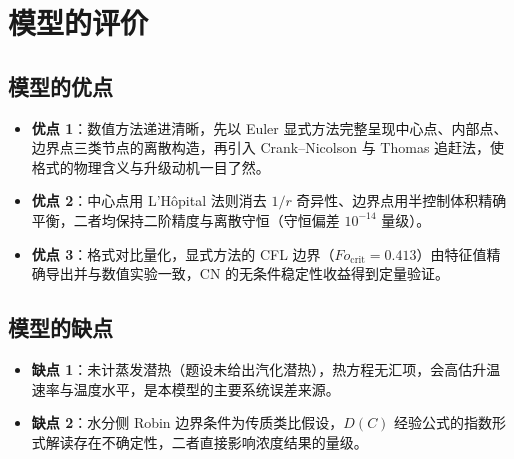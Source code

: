 \section{模型的评价}

\subsection{模型的优点}
\begin{itemize}
  \item \textbf{优点 1}：数值方法递进清晰，先以 Euler 显式方法完整呈现中心点、内部点、边界点三类节点的离散构造，再引入 Crank--Nicolson 与 Thomas 追赶法，使格式的物理含义与升级动机一目了然。
  \item \textbf{优点 2}：中心点用 L'H\^opital 法则消去 $1/r$ 奇异性、边界点用半控制体积精确平衡，二者均保持二阶精度与离散守恒（守恒偏差 $10^{-14}$ 量级）。
  \item \textbf{优点 3}：格式对比量化，显式方法的 CFL 边界（$Fo_{\text{crit}}=0.413$）由特征值精确导出并与数值实验一致，CN 的无条件稳定性收益得到定量验证。
\end{itemize}

\subsection{模型的缺点}
\begin{itemize}
  \item \textbf{缺点 1}：未计蒸发潜热（题设未给出汽化潜热），热方程无汇项，会高估升温速率与温度水平，是本模型的主要系统误差来源。
  \item \textbf{缺点 2}：水分侧 Robin 边界条件为传质类比假设，$D(C)$ 经验公式的指数形式解读存在不确定性，二者直接影响浓度结果的量级。
\end{itemize}
